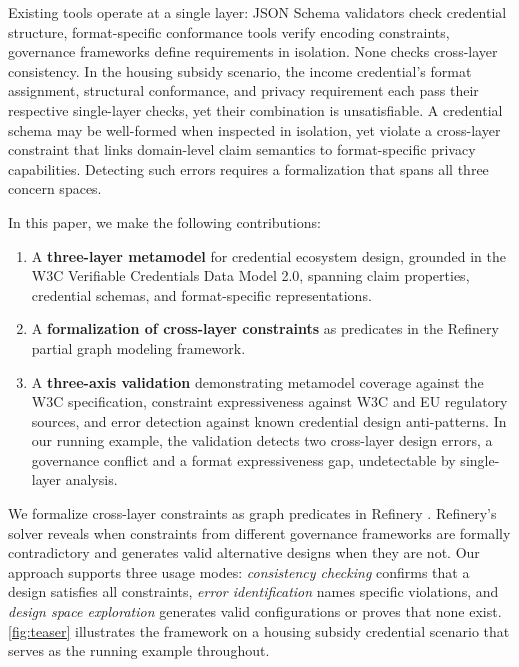 Existing tools operate at a single layer: JSON Schema validators check credential structure, format-specific conformance tools verify encoding constraints, governance frameworks define requirements in isolation. None checks cross-layer consistency. In the housing subsidy scenario, the income credential's format assignment, structural conformance, and privacy requirement each pass their respective single-layer checks, yet their combination is unsatisfiable. A credential schema may be well-formed when inspected in isolation, yet violate a cross-layer constraint that links domain-level claim semantics to format-specific privacy capabilities. Detecting such errors requires a formalization that spans all three concern spaces.

In this paper, we make the following contributions:

\begin{enumerate}
\def\labelenumi{\arabic{enumi}.}
\tightlist
\item
  A \textbf{three-layer metamodel} for credential ecosystem design, grounded in the W3C Verifiable Credentials Data Model 2.0, spanning claim properties, credential schemas, and format-specific representations.
\item
  A \textbf{formalization of cross-layer constraints} as predicates in the Refinery partial graph modeling framework.
\item
  A \textbf{three-axis validation} demonstrating metamodel coverage against the W3C specification, constraint expressiveness against W3C and EU regulatory sources, and error detection against known credential design anti-patterns. In our running example, the validation detects two cross-layer design errors, a governance conflict and a format expressiveness gap, undetectable by single-layer analysis.
\end{enumerate}

We formalize cross-layer constraints as graph predicates in Refinery \citep{marussy_refinery_2024}. Refinery's solver reveals when constraints from different governance frameworks are formally contradictory and generates valid alternative designs when they are not. Our approach supports three usage modes: \emph{consistency checking} confirms that a design satisfies all constraints, \emph{error identification} names specific violations, and \emph{design space exploration} generates valid configurations or proves that none exist. \autoref{fig:teaser} illustrates the framework on a housing subsidy credential scenario that serves as the running example throughout.

